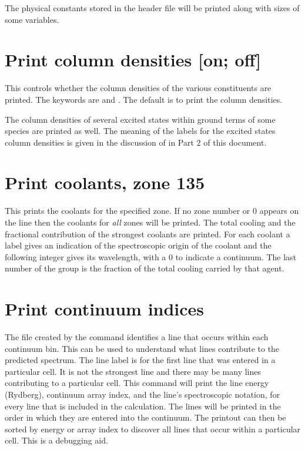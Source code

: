 The physical constants stored in the header file  will be
printed along with sizes of some variables.

\section{Print column densities [on; off]}

This controls whether the column densities of the various constituents
are printed.  The keywords are  and .  The default is to print the
column densities.

The column densities of several excited states within ground terms of
some species are printed as well.  The meaning of the labels for the excited
states column densities is given in the discussion of  in Part 2 of
this document.

\section{Print coolants, zone 135}

This prints the coolants for the specified zone.
If no zone number or
0 appears on the line then the coolants for \emph{all} zones will be printed.
The total cooling and the fractional contribution of the strongest coolants
are printed.  For each coolant a label gives an indication of the
spectroscopic origin of the coolant and the following integer gives its
wavelength, with a 0 to indicate a continuum.  The last number of the group
is the fraction of the total cooling carried by that agent.

\section{Print continuum indices}

The file created by the  command
identifies a line that occurs within each continuum bin.
This can be used
to understand what lines contribute to the predicted spectrum.
The line
label is for the first line that was entered in a particular cell.
It is
not the strongest line and there may be many lines contributing to a
particular cell.
This command will print the line energy (Rydberg),
continuum array index, and the line's spectroscopic notation, for every
line that is included in the calculation.
The lines will be printed in
the order in which they are entered into the continuum.
The printout can
then be sorted by energy or array index to discover all lines that occur
within a particular cell.
This is a debugging aid.

